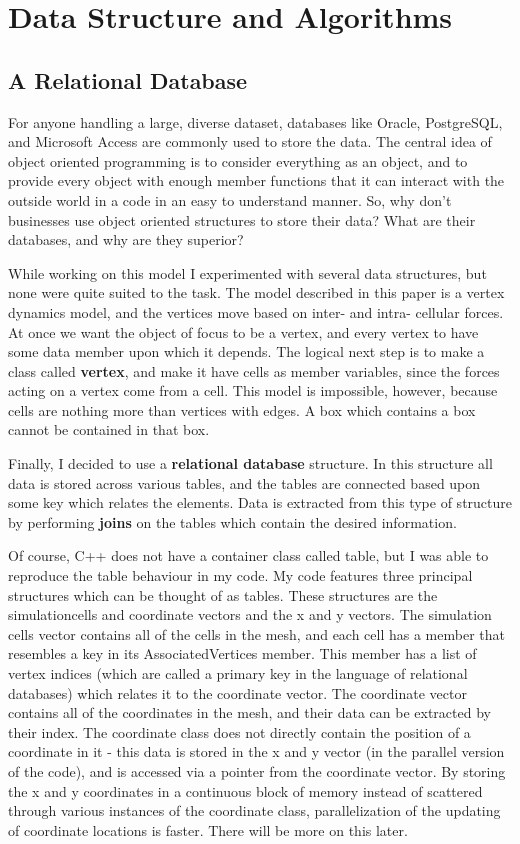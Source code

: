 \chapter{Data Structure and Algorithms}
\section{A Relational Database}
For anyone handling a large, diverse dataset, databases like Oracle, 
PostgreSQL, and Microsoft Access are commonly used to store the data. 
The central idea of object oriented programming is to consider 
everything as an object, and to provide every object with enough 
member functions that it can interact with the outside world in a code 
in an easy to understand manner. So, why don't businesses use object 
oriented structures to store their data? What are their databases, and 
why are they superior?

While working on this model I experimented with several data 
structures, but none were quite suited to the task. The model 
described in this paper is a vertex dynamics model, and the vertices 
move based on inter- and intra- cellular forces. At once we want the 
object of focus to be a vertex, and every vertex to have some data 
member upon which it depends. The logical next step is to make a class 
called \textbf{vertex}, and make it have cells as member variables, 
since the forces acting on a vertex come from a cell. This model is 
impossible, however, because cells are nothing more than vertices 
with edges. A box which contains a box cannot be contained in that 
box. 

Finally, I decided to use a  \textbf{relational database}
structure. In this structure all data is stored across various 
tables, and the tables are connected based upon some key which relates 
the elements. Data is extracted from this type of structure by 
performing \textbf{joins} on the tables which contain the desired 
information.

Of course, C++ does not have a container class called table, but I was 
able to reproduce the table behaviour in my code. My code features 
three principal structures which can be thought of as tables. These 
structures are the simulationcells and coordinate vectors and the x 
and y vectors. The simulation cells vector contains all of the cells 
in the mesh, and each cell has a member that resembles a key in its 
AssociatedVertices member. This member has a list of vertex indices 
(which are called a primary key in the language of relational 
databases) which relates it to the coordinate vector. The coordinate 
vector contains all of the coordinates in the mesh, and their data can 
be extracted by their index. The coordinate class does not directly 
contain the position of a coordinate in it - this data is stored in 
the x and y vector (in the parallel version of the code), and is 
accessed via a pointer from the coordinate vector. By storing the x 
and y coordinates in a continuous block of memory instead of scattered 
through various instances of the coordinate class, parallelization of 
the updating of coordinate locations is faster. There will be more on 
this later.

